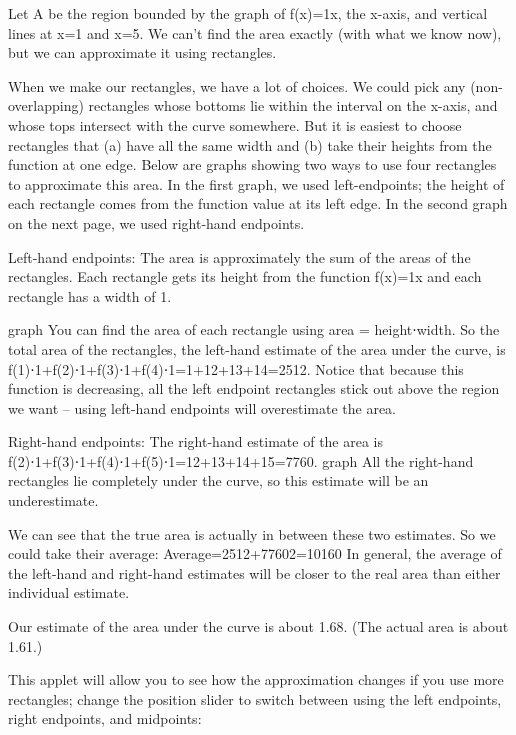 \begin{example}
Let A be the region bounded by the graph of f(x)=1x, the x-axis, and vertical lines at x=1 and x=5. We can’t find the area exactly (with what we know now), but we can approximate it using rectangles.

\begin{solution}
When we make our rectangles, we have a lot of choices. We could pick any (non-overlapping) rectangles whose bottoms lie within the interval on the x-axis, and whose tops intersect with the curve somewhere. But it is easiest to choose rectangles that (a) have all the same width and (b) take their heights from the function at one edge. Below are graphs showing two ways to use four rectangles to approximate this area. In the first graph, we used left-endpoints; the height of each rectangle comes from the function value at its left edge. In the second graph on the next page, we used right-hand endpoints.

Left-hand endpoints: The area is approximately the sum of the areas of the rectangles. Each rectangle gets its height from the function f(x)=1x and each rectangle has a width of 1.

graph
You can find the area of each rectangle using area = height⋅width. So the total area of the rectangles, the left-hand estimate of the area under the curve, is
f(1)⋅1+f(2)⋅1+f(3)⋅1+f(4)⋅1=1+12+13+14=2512.
Notice that because this function is decreasing, all the left endpoint rectangles stick out above the region we want – using left-hand endpoints will overestimate the area.

Right-hand endpoints: The right-hand estimate of the area is
f(2)⋅1+f(3)⋅1+f(4)⋅1+f(5)⋅1=12+13+14+15=7760.
graph
All the right-hand rectangles lie completely under the curve, so this estimate will be an underestimate.

We can see that the true area is actually in between these two estimates. So we could take their average:
Average=2512+77602=10160
In general, the average of the left-hand and right-hand estimates will be closer to the real area than either individual estimate.

Our estimate of the area under the curve is about 1.68. (The actual area is about 1.61.)

This applet will allow you to see how the approximation changes if you use more rectangles; change the position slider to switch between using the left endpoints, right endpoints, and midpoints:
\end{solution}\end{example}


